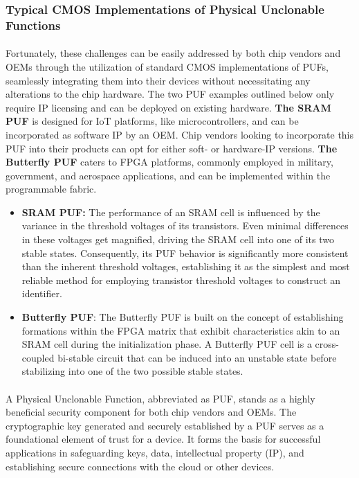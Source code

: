 \subsubsection{Typical CMOS Implementations of Physical Unclonable Functions}
\paragraph*{}
Fortunately, these challenges can be easily addressed by both chip vendors and OEMs through the utilization of standard CMOS implementations of PUFs, seamlessly integrating them into their devices without necessitating any alterations to the chip hardware. The two PUF examples outlined below only require IP licensing and can be deployed on existing hardware. \textbf{The SRAM PUF} is designed for IoT platforms, like microcontrollers, and can be incorporated as software IP by an OEM. Chip vendors looking to incorporate this PUF into their products can opt for either soft- or hardware-IP versions. \textbf{The Butterfly PUF} caters to FPGA platforms, commonly employed in military, government, and aerospace applications, and can be implemented within the programmable fabric.

\begin{itemize}
	\item \textbf{SRAM PUF:} The performance of an SRAM cell is influenced by the variance in the threshold voltages of its transistors. Even minimal differences in these voltages get magnified, driving the SRAM cell into one of its two stable states. Consequently, its PUF behavior is significantly more consistent than the inherent threshold voltages, establishing it as the simplest and most reliable method for employing transistor threshold voltages to construct an identifier.
	\item \textbf{Butterfly PUF}: The Butterfly PUF is built on the concept of establishing formations within the FPGA matrix that exhibit characteristics akin to an SRAM cell during the initialization phase. A Butterfly PUF cell is a cross-coupled bi-stable circuit that can be induced into an unstable state before stabilizing into one of the two possible stable states.
\end{itemize}
\paragraph*{}
A Physical Unclonable Function, abbreviated as PUF, stands as a highly beneficial security component for both chip vendors and OEMs. The cryptographic key generated and securely established by a PUF serves as a foundational element of trust for a device. It forms the basis for successful applications in safeguarding keys, data, intellectual property (IP), and establishing secure connections with the cloud or other devices.
